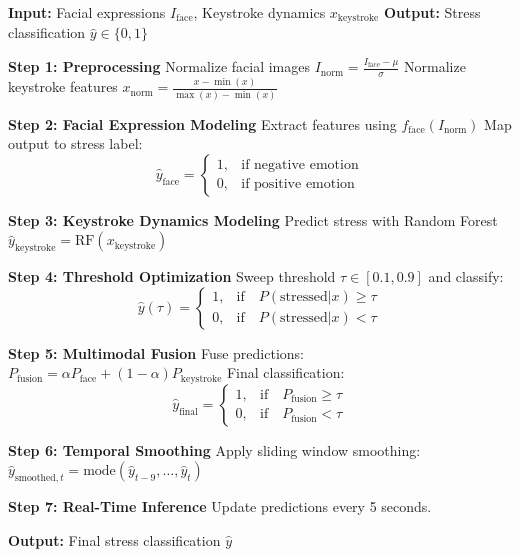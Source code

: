 \documentclass[fleqn,10pt]{wlscirep}
\begin{document}
\begin{algorithm}[h!]
\caption{Multimodal Stress Detection Using Facial Expressions and Keystroke Dynamics}
\label{alg:stress_detection}
\begin{algorithmic}[1]
\State \textbf{Input:} Facial expressions \(I_{\text{face}}\), Keystroke dynamics \(x_{\text{keystroke}}\)
\State \textbf{Output:} Stress classification \( \hat{y} \in \{0, 1\} \)

\State \textbf{Step 1: Preprocessing}
\State Normalize facial images \( I_{\text{norm}} = \frac{I_{\text{face}} - \mu}{\sigma} \)
\State Normalize keystroke features \( x_{\text{norm}} = \frac{x - \min(x)}{\max(x) - \min(x)} \)

\State \textbf{Step 2: Facial Expression Modeling}
\State Extract features using \( f_{\text{face}}(I_{\text{norm}}) \)
\State Map output to stress label: 
\[
\hat{y}_{\text{face}} =
\begin{cases}
1, & \text{if negative emotion} \\
0, & \text{if positive emotion}
\end{cases}
\]

\State \textbf{Step 3: Keystroke Dynamics Modeling}
\State Predict stress with Random Forest \( \hat{y}_{\text{keystroke}} = \text{RF}(x_{\text{keystroke}}) \)

\State \textbf{Step 4: Threshold Optimization}
\State Sweep threshold \( \tau \in [0.1, 0.9] \) and classify:
\[
\hat{y}(\tau) =
\begin{cases}
1, & \text{if} \quad P(\text{stressed}|x) \geq \tau \\
0, & \text{if} \quad P(\text{stressed}|x) < \tau
\end{cases}
\]

\State \textbf{Step 5: Multimodal Fusion}
\State Fuse predictions: \( P_{\text{fusion}} = \alpha P_{\text{face}} + (1 - \alpha) P_{\text{keystroke}} \)
\State Final classification: 
\[
\hat{y}_{\text{final}} =
\begin{cases}
1, & \text{if} \quad P_{\text{fusion}} \geq \tau \\
0, & \text{if} \quad P_{\text{fusion}} < \tau
\end{cases}
\]

\State \textbf{Step 6: Temporal Smoothing}
\State Apply sliding window smoothing: \( \hat{y}_{\text{smoothed}, t} = \text{mode}(\hat{y}_{t-9}, \dots, \hat{y}_t) \)

\State \textbf{Step 7: Real-Time Inference}
\State Update predictions every 5 seconds.

\State \textbf{Output:} Final stress classification \( \hat{y} \)
\end{algorithmic}
\end{algorithm}
\end{document}
